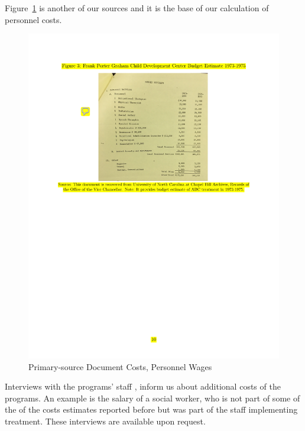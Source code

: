 \noindent Figure~\ref{figure:wages} is another of our sources and it is the base of our calculation of personnel costs.

\begin{center}
\begin{figure}[H] 
\caption{Primary-source Document Costs, Personnel Wages}
\label{figure:wages}
\centering
\includegraphics[width=.9\columnwidth]{AppOutput/Program/UNC-costs_budget.pdf}
\end{figure}
\end{center}

\noindent Interviews with the programs' staff \citet{projectcare2014interviews,abc2014-2015interviews}, inform us about additional costs of the programs. An example is the salary of a social worker, who is not part of some of the of the costs estimates reported before but was part of the staff implementing treatment. These interviews are available upon request. 

